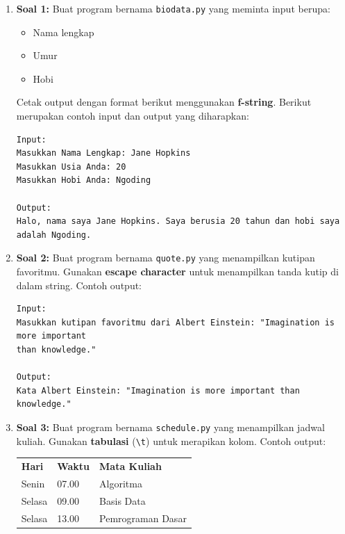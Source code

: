 \begin{enumerate}
\item \textbf{Soal 1:} Buat program bernama \texttt{biodata.py} yang meminta input berupa:
\begin{itemize}
	\item Nama lengkap
	\item Umur
	\item Hobi
\end{itemize}
	Cetak output dengan format berikut menggunakan \textbf{f-string}. Berikut merupakan contoh input dan output yang diharapkan:
\begin{verbatim}
Input:
Masukkan Nama Lengkap: Jane Hopkins
Masukkan Usia Anda: 20
Masukkan Hobi Anda: Ngoding

Output:
Halo, nama saya Jane Hopkins. Saya berusia 20 tahun dan hobi saya adalah Ngoding.
\end{verbatim}

\item \textbf{Soal 2:}  
Buat program bernama \texttt{quote.py} yang menampilkan kutipan favoritmu. Gunakan \textbf{escape character} untuk menampilkan tanda kutip di dalam string. Contoh output:

\begin{verbatim}
Input:
Masukkan kutipan favoritmu dari Albert Einstein: "Imagination is more important 
than knowledge."

Output:
Kata Albert Einstein: "Imagination is more important than knowledge."
\end{verbatim}

\item \textbf{Soal 3:} Buat program bernama \texttt{schedule.py} yang menampilkan jadwal kuliah. Gunakan \textbf{tabulasi} (\texttt{\textbackslash t}) untuk merapikan kolom. Contoh output:

\begin{tabular}{l l l}
    \textbf{Hari} & \textbf{Waktu} & \textbf{Mata Kuliah} \\
    Senin & 07.00 & Algoritma \\
    Selasa & 09.00 & Basis Data \\
    Selasa & 13.00 & Pemrograman Dasar \\
\end{tabular}
\end{enumerate}
